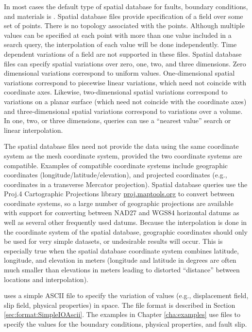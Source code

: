 In most cases the default type of spatial database for faults, boundary
conditions, and materials is . Spatial database files
provide specification of a field over some set of points. There is
no topology associated with the points. Although multiple values can
be specified at each point with more than one value included in a
search query, the interpolation of each value will be done independently.
Time dependent variations of a field are not supported in these files.
Spatial database files can specify spatial variations over zero, one,
two, and three dimensions. Zero dimensional variations correspond
to uniform values. One-dimensional spatial variations correspond to
piecewise linear variations, which need not coincide with coordinate
axes. Likewise, two-dimensional spatial variations correspond to variations
on a planar surface (which need not coincide with the coordinate axes)
and three-dimensional spatial variations correspond to variations
over a volume. In one, two, or three dimensions, queries can use a
``nearest value'' search or linear interpolation.

The spatial database files need not provide the data using the same
coordinate system as the mesh coordinate system, provided the two
coordinate systems are compatible. Examples of compatible coordinate
systems include geographic coordinates (longitude/latitude/elevation),
and projected coordinates (e.g., coordinates in a transverse Mercator
projection). Spatial database queries use the Proj.4 Cartographic
Projections library \url{proj.maptools.org} to convert between coordinate
systems, so a large number of geographic projections are available
with support for converting between NAD27 and WGS84 horizontal datums
as well as several other frequently used datums. Because the interpolation
is done in the coordinate system of the spatial database, geographic
coordinates should only be used for very simple datasets, or undesirable
results will occur. This is especially true when the spatial database
coordinate system combines latitude, longitude, and elevation in meters
(longitude and latitude in degrees are often much smaller than elevations
in meters leading to distorted ``distance'' between locations and
interpolation).

 uses a simple ASCII file to specify the variation of values (e.g., displacement field, slip field, physical properties) in space.  The file format is described in Section \vref{sec:format:SimpleIOAscii}.  The examples in Chapter \vref{cha:examples} use  files to specify the values for the boundary conditions, physical properties, and fault slip.


